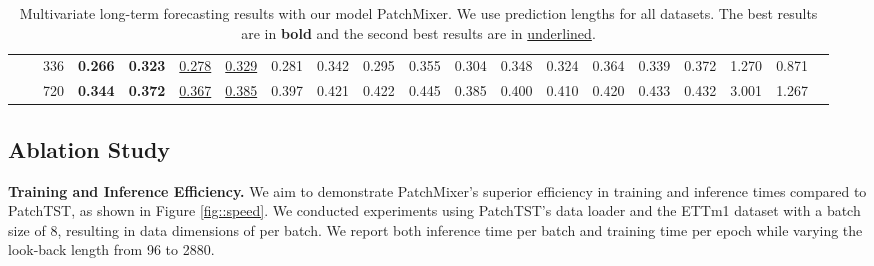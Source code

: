 \documentclass{article} \usepackage{iclr2024_conference,times}
\begin{document}
\begin{table}[ht]
{\begin{tabular}{cc|c|cc|cc|cc|cc|cc|cc|cc|ccc}
            &\multicolumn{1}{c|}{}& 336   & \textbf{0.266} & \textbf{0.323} & \uline{0.278} & \uline{0.329} & 0.281                                                    & 0.342  & 0.295                                                    & 0.355                                                  & 0.304                                                    & 0.348                                                    & 0.324                                                     & 0.364                                                    & 0.339                                                     & 0.372                                                     & 1.270                                                    & 0.871                                                  \\
            &\multicolumn{1}{c|}{}& 720 & \textbf{0.344} & \textbf{0.372} & \uline{0.367} & \uline{0.385}  & 0.397                                                    & 0.421 & 0.422                                                    & 0.445                                                    & 0.385                                                    & 0.400                                                    & 0.410                                                     & 0.420                                                    & 0.433                                                     & 0.432                                                     & 3.001                                                    & 1.267                                                    \\
			\cline{2-19}
		\end{tabular}
	}
	\caption{Multivariate long-term forecasting results with our model PatchMixer. We use prediction lengths  for all datasets. The best results are in \textbf{bold} and the second best results are in \uline{underlined}.}
	\label{tab::multivariate}
\end{table}
\linespread{1}



\subsection{Ablation Study}
\label{sec::ablation}

\noindent \textbf{Training and Inference Efficiency.} We aim to demonstrate PatchMixer's superior efficiency in training and inference times compared to PatchTST, as shown in Figure \ref{fig::speed}. We conducted experiments using PatchTST's data loader and the ETTm1 dataset with a batch size of 8, resulting in data dimensions of  per batch. We report both inference time per batch and training time per epoch while varying the look-back length from 96 to 2880.
\end{document}
